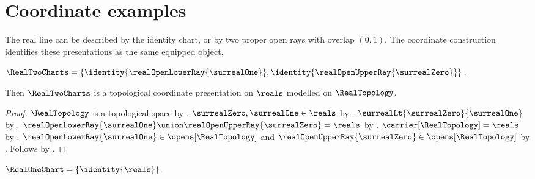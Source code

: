 \section{Coordinate examples}







The real line can be described by the identity chart, or by two proper
open rays with overlap $(0,1)$. The coordinate construction identifies these
presentations as the same equipped object.

\begin{definition}\label{real_two_charts}
    $\RealTwoCharts=
        \{\identity{\realOpenLowerRay{\surrealOne}},
            \identity{\realOpenUpperRay{\surrealZero}}\}$.
\end{definition}

\begin{classification}\label{real_two_charts_presentation}
    Then $\RealTwoCharts$ is a topological coordinate presentation on $\reals$
        modelled on $\RealTopology$.
\end{classification}
\begin{proof}
    $\RealTopology$ is a topological space by .
    $\surrealZero,\surrealOne\in\reals$ by
        .
    $\surrealLt{\surrealZero}{\surrealOne}$ by .
    $\realOpenLowerRay{\surrealOne}\union\realOpenUpperRay{\surrealZero}=\reals$ by
        .
    $\carrier[\RealTopology]=\reals$ by .
    $\realOpenLowerRay{\surrealOne}\in\opens[\RealTopology]$ and
        $\realOpenUpperRay{\surrealZero}\in\opens[\RealTopology]$ by
        .
    Follows by .
\end{proof}

\begin{definition}\label{real_one_chart}
    $\RealOneChart=\{\identity{\reals}\}$.
\end{definition}

